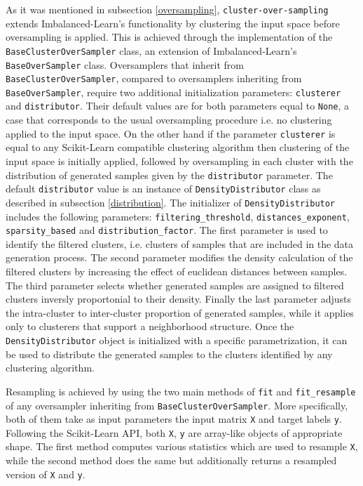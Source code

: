 \documentclass[preprint,12pt, a4paper]{elsarticle}
\begin{document}
As it was mentioned in subsection \ref{oversampling}, \texttt{cluster-over-sampling} extends Imbalanced-Learn's functionality by clustering the input space before oversampling is applied. This is achieved through the implementation of the \texttt{BaseClusterOverSampler} class, an extension of Imbalanced-Learn's \texttt{BaseOverSampler} class. Oversamplers that inherit from \texttt{BaseClusterOverSampler}, compared to oversamplers inheriting from \texttt{BaseOverSampler}, require two additional initialization parameters: \texttt{clusterer} and \texttt{distributor}. Their default values are for both parameters equal to \texttt{None}, a case that corresponds to the usual oversampling procedure i.e. no clustering applied to the input space. On the other hand if the parameter \texttt{clusterer} is equal to any Scikit-Learn compatible clustering algorithm then clustering of the input space is initially applied, followed by oversampling in each cluster with the distribution of generated samples given by the \texttt{distributor} parameter. The default \texttt{distributor} value is an instance of \texttt{DensityDistributor} class as described in subsection \ref{distribution}. The initializer of \texttt{DensityDistributor} includes the following parameters: \texttt{filtering\_threshold}, \texttt{distances\_exponent}, \texttt{sparsity\_based} and \texttt{distribution\_factor}. The first parameter is used to identify the filtered clusters, i.e. clusters of samples that are included in the data generation process. The second parameter modifies the density calculation of the filtered clusters by increasing the effect of euclidean distances between samples. The third parameter selects whether generated samples are assigned to filtered clusters inversly proportonial to their density. Finally the last parameter adjusts the intra-cluster to inter-cluster proportion of generated samples, while it applies only to clusterers that support a neighborhood structure. Once the \texttt{DensityDistributor} object is initialized with a specific parametrization, it can be used to distribute the generated samples to the clusters identified by any clustering algorithm.

Resampling is achieved by using the two main methods of \texttt{fit} and \texttt{fit\_resample} of any oversampler inheriting from \texttt{BaseClusterOverSampler}. More specifically, both of them take as input parameters the input matrix \texttt{X} and target labels \texttt{y}. Following the Scikit-Learn API, both \texttt{X}, \texttt{y} are array-like objects of appropriate shape. The first method computes various statistics which are used to resample \texttt{X}, while the second method does the same but additionally returns a resampled version of \texttt{X} and \texttt{y}.
\end{document}
